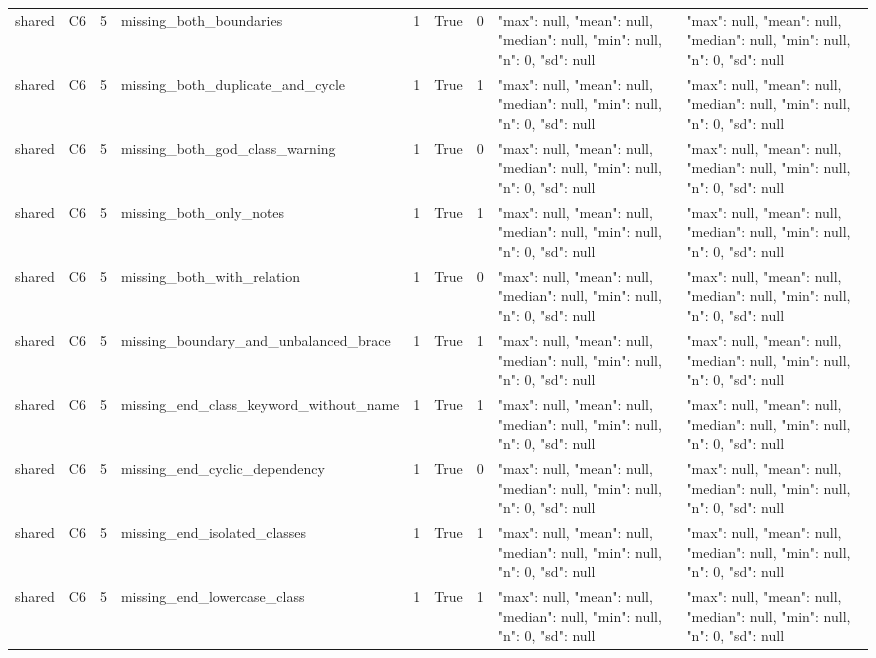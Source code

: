 \begin{tabular}{lllllllll}
shared & C6 & 5 & missing\_both\_boundaries & 1 & True & 0 & {"max": null, "mean": null, "median": null, "min": null, "n": 0, "sd": null} & {"max": null, "mean": null, "median": null, "min": null, "n": 0, "sd": null} \\
shared & C6 & 5 & missing\_both\_duplicate\_and\_cycle & 1 & True & 1 & {"max": null, "mean": null, "median": null, "min": null, "n": 0, "sd": null} & {"max": null, "mean": null, "median": null, "min": null, "n": 0, "sd": null} \\
shared & C6 & 5 & missing\_both\_god\_class\_warning & 1 & True & 0 & {"max": null, "mean": null, "median": null, "min": null, "n": 0, "sd": null} & {"max": null, "mean": null, "median": null, "min": null, "n": 0, "sd": null} \\
shared & C6 & 5 & missing\_both\_only\_notes & 1 & True & 1 & {"max": null, "mean": null, "median": null, "min": null, "n": 0, "sd": null} & {"max": null, "mean": null, "median": null, "min": null, "n": 0, "sd": null} \\
shared & C6 & 5 & missing\_both\_with\_relation & 1 & True & 0 & {"max": null, "mean": null, "median": null, "min": null, "n": 0, "sd": null} & {"max": null, "mean": null, "median": null, "min": null, "n": 0, "sd": null} \\
shared & C6 & 5 & missing\_boundary\_and\_unbalanced\_brace & 1 & True & 1 & {"max": null, "mean": null, "median": null, "min": null, "n": 0, "sd": null} & {"max": null, "mean": null, "median": null, "min": null, "n": 0, "sd": null} \\
shared & C6 & 5 & missing\_end\_class\_keyword\_without\_name & 1 & True & 1 & {"max": null, "mean": null, "median": null, "min": null, "n": 0, "sd": null} & {"max": null, "mean": null, "median": null, "min": null, "n": 0, "sd": null} \\
shared & C6 & 5 & missing\_end\_cyclic\_dependency & 1 & True & 0 & {"max": null, "mean": null, "median": null, "min": null, "n": 0, "sd": null} & {"max": null, "mean": null, "median": null, "min": null, "n": 0, "sd": null} \\
shared & C6 & 5 & missing\_end\_isolated\_classes & 1 & True & 1 & {"max": null, "mean": null, "median": null, "min": null, "n": 0, "sd": null} & {"max": null, "mean": null, "median": null, "min": null, "n": 0, "sd": null} \\
shared & C6 & 5 & missing\_end\_lowercase\_class & 1 & True & 1 & {"max": null, "mean": null, "median": null, "min": null, "n": 0, "sd": null} & {"max": null, "mean": null, "median": null, "min": null, "n": 0, "sd": null} \\

\end{tabular}

